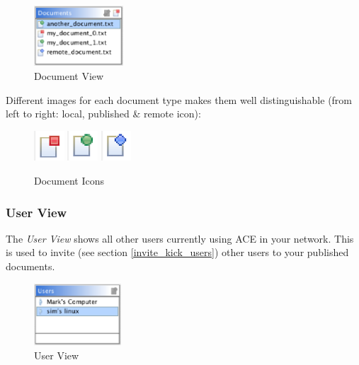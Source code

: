 \documentclass[11pt,a4paper]{article}
\begin{document}
\begin{figure}[H]
\begin{center}
  \includegraphics[height=0.89in, width=1.31in]{../images/usermanual/dview_overview.eps}
\caption{Document View}
\label{view_document}
\end{center}
\end{figure}

Different images for each document type makes them well distinguishable (from left to right: local, published \& remote icon):

\begin{figure}[H]
\begin{center}
  \includegraphics[height=32pt, width=32pt]{../images/usermanual/icon_local.eps}
\vspace{24pt}
  \includegraphics[height=32pt, width=32pt]{../images/usermanual/icon_published.eps}
\vspace{24pt}
  \includegraphics[height=32pt, width=32pt]{../images/usermanual/icon_remote.eps}
\caption{Document Icons}
\label{default}
\end{center}
\end{figure}

\subsubsection{User View}
The \textit{User View} shows all other users currently using ACE in your network. This is used to invite (see section \ref{invite_kick_users}) other users to your published documents. \\

\begin{figure}[H]
\begin{center}
  \includegraphics[height=0.91in, width=1.28in]{../images/usermanual/uview_overview.eps}
\caption{User View}
\label{view_user}
\end{center}
\end{figure}
\end{document}
